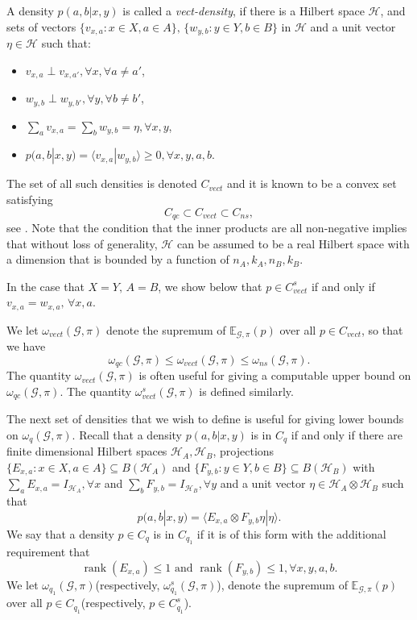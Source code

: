 \documentclass[11pt]{amsart}
\theoremstyle{definition}
\DeclareMathOperator{\rk}{rank}
\newcommand{\bb}[1]{\mathbb{#1}}
\newcommand{\cl}[1]{\mathcal{#1}}
\begin{document}
A density $p(a,b|x,y)$ is called a {\it vect-density}, if there is a Hilbert space $\cl H$, and sets of vectors $\{ v_{x,a}: x \in X, a \in A \}, \, \{ w_{y,b}: y \in Y, b \in B \}$ in $\cl H$ and a unit vector $\eta \in \cl H$ such that:
\begin{itemize}
\item $v_{x,a} \perp v_{x,a'}, \forall x, \forall a \ne a'$,
\item $w_{y,b} \perp w_{y, b'}, \forall y, \forall b \ne b'$,
\item $\sum_a v_{x,a} = \sum_b w_{y,b} = \eta, \forall x,y$,
\item $p(a,b|x,y) = \langle v_{x,a} | w_{y,b} \rangle \ge 0, \forall x,y,a,b$.\end{itemize}
The set of all such densities is denoted $C_{vect}$ and it is known to be a convex set satisfying
\[ C_{qc} \subset C_{vect} \subset C_{ns}, \] see \cite{PT}.
 Note that the condition that the inner products are all non-negative implies that without loss of generality, $\cl H$ can be assumed to be a real Hilbert space with a dimension that is bounded by a function of $n_A, k_A, n_B, k_B$.

In the case that $X=Y, \, A=B$, we show below that $p \in C^s_{vect}$ if and only if $v_{x,a} = w_{x,a}, \, \forall x,a$.

 We let $\omega_{vect}(\cl G, \pi)$ denote the supremum of $\bb E_{\cl G, \pi}(p)$ over all $p \in C_{vect}$, so that we have
 \[ \omega_{qc}(\cl G, \pi) \le \omega_{vect}(\cl G, \pi) \le \omega_{ns}(\cl G, \pi).\]
 The quantity $\omega_{vect}(\cl G, \pi)$ is often useful for giving a computable upper bound on $\omega_{qc}(\cl G, \pi)$.
 The quantity $\omega_{vect}^s(\cl G, \pi)$ is defined similarly.

 The next set of densities that we wish to define is useful for giving lower bounds on $\omega_q(\cl G, \pi)$.
 Recall that a density $p(a,b|x,y)$ is in $C_q$ if and only if there are finite dimensional Hilbert spaces $\cl H_A, \cl H_B$, projections $\{ E_{x,a} : x \in X, a \in A \} \subseteq B(\cl H_A)$ and $\{ F_{y,b}: y \in Y, b \in B \} \subseteq B(\cl H_B)$ with $ \sum_a E_{x,a} = I_{\cl H_A}, \forall x$ and $\sum_b F_{y,b} = I_{\cl H_B}, \forall y$ and a unit vector $\eta \in \cl H_A \otimes \cl H_B$ such that
 \[ p(a,b| x,y) = \langle E_{x,a} \otimes F_{y,b} \eta | \eta \rangle.\]
 We say that a density $p \in C_q$ is in $C_{q_1}$ if it is of this form with the additional requirement that
 \[ \rk(E_{x,a}) \le 1 \text{ and } \rk(F_{y,b}) \le 1,  \forall x,y,a,b.\]
 We let $\omega_{q_1}( \cl G, \pi)$(respectively, $\omega_{q_1}^s(\cl G, \pi)$), denote the supremum of $\bb E_{\cl G, \pi}(p)$ over all $p \in C_{q_1}$(respectively, $p \in C_{q_1}^s$).
\end{document}
